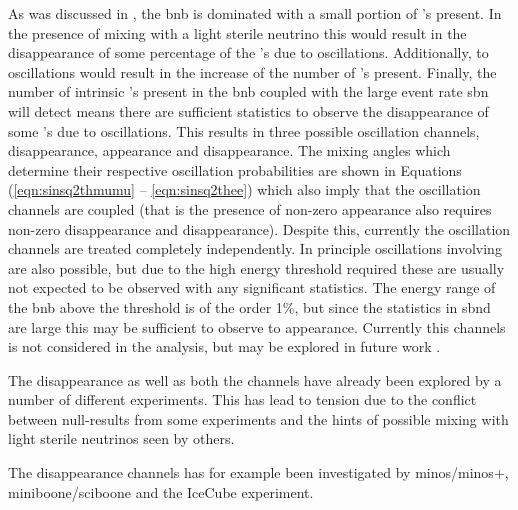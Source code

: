 As was discussed in , the \gls{bnb} is \numu dominated with a small portion of \nue's present. In the presence of mixing with a light sterile neutrino 
this would result in the disappearance of some percentage of the \numu's due to oscillations. Additionally, \numu to \nue oscillations would result in the increase of the number of \nue's present. Finally, the number of intrinsic \nue's present in the \gls{bnb} coupled with the large event rate \gls{sbn} will detect means there are sufficient statistics to observe the disappearance of some \nue's due to oscillations. This results in three possible oscillation channels, \numu disappearance, \nue appearance and \nue disappearance. The mixing angles which determine their respective oscillation probabilities are shown in Equations (\ref{eqn:sinsq2thmumu} -- \ref{eqn:sinsq2thee}) which also imply that the oscillation channels are coupled (that is the presence of non-zero \nue appearance also requires non-zero \numu disappearance and \nue disappearance). Despite this, currently the oscillation channels are treated completely independently. 
In principle oscillations involving \nutau are also possible, but due to the high energy threshold required these are usually not expected to be observed with any significant statistics. The energy range of the \gls{bnb} above the \nutau threshold is of the order 1\%, but since the statistics in \gls{sbnd} are large this may be sufficient to observe \numu to \nutau appearance. Currently this channels is not considered in the analysis, but may be explored in future work \cite{tau_oscillations}.


The \numu disappearance as well as both the \nue channels have already been explored by a number of different experiments. This has lead to tension due to the conflict between null-results from some experiments and the hints of possible mixing with light sterile neutrinos seen by others. 

The \numu disappearance channels has for example been investigated by \gls{minos}/\gls{minos}+, \gls{miniboone}/\gls{sciboone} and the IceCube experiment.


